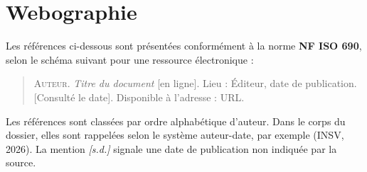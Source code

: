 \clearpage
\section*{Webographie}

Les références ci-dessous sont présentées conformément à la norme
\textbf{NF ISO 690}, selon le schéma suivant pour une ressource électronique :

\begin{quote}
\small
\textsc{Auteur}. \textit{Titre du document} [en ligne]. Lieu : Éditeur, date de
publication. [Consulté le date]. Disponible à l'adresse : URL.
\end{quote}

Les références sont classées par ordre alphabétique d'auteur. Dans le corps du
dossier, elles sont rappelées selon le système auteur-date, par exemple
(INSV, 2026). La mention \textit{[s.d.]} signale une date de publication non
indiquée par la source.

\vspace{1em}

